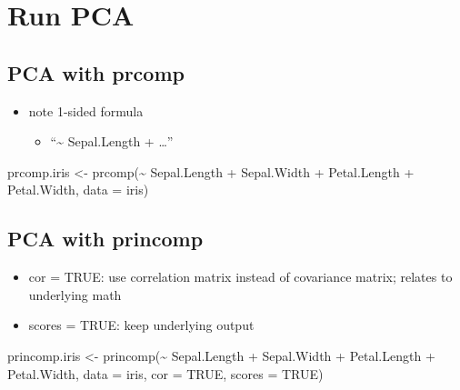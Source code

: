 \documentclass[
]{book}
\newenvironment{Shaded}{\begin{snugshade}}{\end{snugshade}}
\newcommand{\AttributeTok}[1]{\textcolor[rgb]{0.77,0.63,0.00}{#1}}
\newcommand{\ConstantTok}[1]{\textcolor[rgb]{0.00,0.00,0.00}{#1}}
\newcommand{\FunctionTok}[1]{\textcolor[rgb]{0.00,0.00,0.00}{#1}}
\newcommand{\NormalTok}[1]{#1}
\newcommand{\OtherTok}[1]{\textcolor[rgb]{0.56,0.35,0.01}{#1}}
\newcommand{\SpecialCharTok}[1]{\textcolor[rgb]{0.00,0.00,0.00}{#1}}
\providecommand{\tightlist}{%
  \setlength{\itemsep}{0pt}\setlength{\parskip}{0pt}}
\begin{document}
\hypertarget{run-pca}{%
\section{Run PCA}\label{run-pca}}

\hypertarget{pca-with-prcomp}{%
\subsection{PCA with prcomp}\label{pca-with-prcomp}}

\begin{itemize}
\tightlist
\item
  note 1-sided formula

  \begin{itemize}
  \tightlist
  \item
    ``\textasciitilde{} Sepal.Length + \ldots{}''
  \end{itemize}
\end{itemize}

\begin{Shaded}
\begin{Highlighting}[]
\NormalTok{prcomp.iris }\OtherTok{\textless{}{-}} \FunctionTok{prcomp}\NormalTok{(}\SpecialCharTok{\textasciitilde{}}\NormalTok{ Sepal.Length }\SpecialCharTok{+} 
\NormalTok{         Sepal.Width }\SpecialCharTok{+} 
\NormalTok{         Petal.Length }\SpecialCharTok{+} 
\NormalTok{         Petal.Width, }
         \AttributeTok{data =}\NormalTok{ iris)}
\end{Highlighting}
\end{Shaded}

\hypertarget{pca-with-princomp}{%
\subsection{PCA with princomp}\label{pca-with-princomp}}

\begin{itemize}
\tightlist
\item
  cor = TRUE: use correlation matrix instead of covariance matrix; relates to underlying math
\item
  scores = TRUE: keep underlying output
\end{itemize}

\begin{Shaded}
\begin{Highlighting}[]
\NormalTok{princomp.iris }\OtherTok{\textless{}{-}} \FunctionTok{princomp}\NormalTok{(}\SpecialCharTok{\textasciitilde{}}\NormalTok{ Sepal.Length }\SpecialCharTok{+} 
\NormalTok{                        Sepal.Width }\SpecialCharTok{+} 
\NormalTok{                        Petal.Length }\SpecialCharTok{+} 
\NormalTok{                        Petal.Width, }
                      \AttributeTok{data =}\NormalTok{ iris,}
                      \AttributeTok{cor =} \ConstantTok{TRUE}\NormalTok{,    }
                      \AttributeTok{scores =} \ConstantTok{TRUE}\NormalTok{)}
\end{Highlighting}
\end{Shaded}
\end{document}
